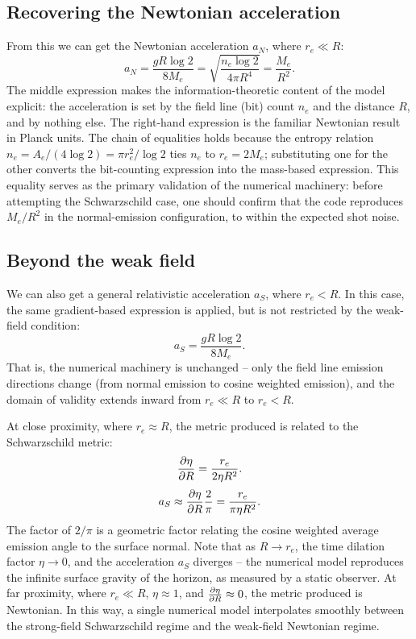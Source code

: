\documentclass[10pt]{article}
\begin{document}
\subsection{Recovering the Newtonian acceleration}

From this we can get the Newtonian acceleration $a_N$, where $r_e \ll R$:
\begin{equation}
a_N =\frac{g R \log 2}{8 M_{e}} =  \sqrt{\frac{n_e \log 2}{4 \pi R^4}} = \frac{M_{e}}{R^2}.
\end{equation}
The middle expression makes the information-theoretic content of the model explicit: the acceleration is set by the field line (bit) count $n_e$ and the distance $R$, and by nothing else.
The right-hand expression is the familiar Newtonian result in Planck units.
The chain of equalities holds because the entropy relation $n_e = A_e / (4 \log 2) = \pi r_e^2 / \log 2$ ties $n_e$ to $r_e = 2 M_e$; substituting one for the other converts the bit-counting expression into the mass-based expression.
This equality serves as the primary validation of the numerical machinery: before attempting the Schwarzschild case, one should confirm that the code reproduces $M_e / R^2$ in the normal-emission configuration, to within the expected shot noise.

\subsection{Beyond the weak field}

We can also get a general relativistic acceleration $a_S$, where $r_e < R$.
In this case, the same gradient-based expression is applied, but is not restricted by the weak-field condition:
\begin{equation}
a_S = \frac{g R \log 2}{8 M_{e}}.
\end{equation}
That is, the numerical machinery is unchanged -- only the field line emission directions change (from normal emission to cosine weighted emission), and the domain of validity extends inward from $r_e \ll R$ to $r_e < R$.

At close proximity, where $r_e \approx R$, the metric produced is related to the Schwarzschild metric:
\begin{equation}
\pdv{\eta}{R} = \frac{r_e}{2 \eta R^2}.
\end{equation}
\begin{equation}
a_S \approx \pdv{\eta}{R} \frac{2}{\pi} = \frac{r_e}{\pi \eta R^2}.
\end{equation}
The factor of $2 / \pi$ is a geometric factor relating the cosine weighted average emission angle to the surface normal.
Note that as $R \to r_e$, the time dilation factor $\eta \to 0$, and the acceleration $a_S$ diverges -- the numerical model reproduces the infinite surface gravity of the horizon, as measured by a static observer.
At far proximity, where $r_e \ll R$, $\eta \approx 1$, and $\pdv{\eta}{R} \approx 0$, the metric produced is Newtonian.
In this way, a single numerical model interpolates smoothly between the strong-field Schwarzschild regime and the weak-field Newtonian regime.
\end{document}
